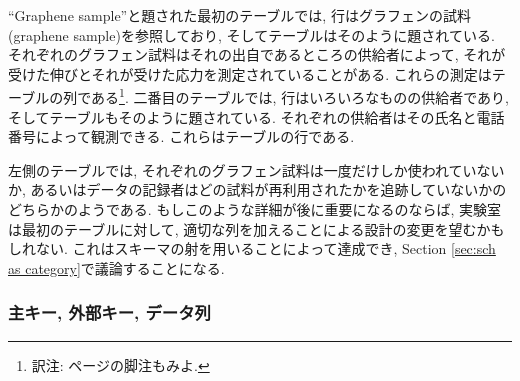 \begin{example}

``Graphene sample''と題された最初のテーブルでは, 行はグラフェンの試料(graphene sample)を参照しており, そしてテーブルはそのように題されている. それぞれのグラフェン試料はそれの出自であるところの供給者によって, それが受けた伸びとそれが受けた応力を測定されていることがある. これらの測定はテーブルの列である\footnote{訳注: \pageref{translator footnote dimension and uncertainty}ページの脚注もみよ.}. 二番目のテーブルでは, 行はいろいろなものの供給者であり, そしてテーブルもそのように題されている. それぞれの供給者はその氏名と電話番号によって観測できる. これらはテーブルの行である.


左側のテーブルでは, それぞれのグラフェン試料は一度だけしか使われていないか, あるいはデータの記録者はどの試料が再利用されたかを追跡していないかのどちらかのようである. もしこのような詳細が後に重要になるのならば, 実験室は最初のテーブルに対して, 適切な列を加えることによる設計の変更を望むかもしれない. これはスキーマの射を用いることによって達成でき, Section \ref{sec:sch as category}で議論することになる.

\end{example}


\subsubsection{主キー, 外部キー, データ列}

